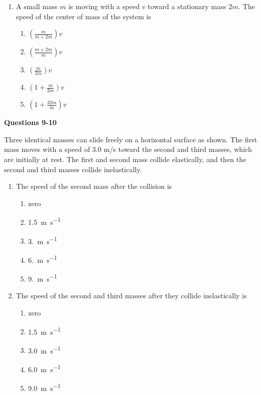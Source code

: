 \documentclass{../../oss-apphys}
\begin{document}
\begin{multicols}{2}
\begin{enumerate}[leftmargin=18pt,resume]
  \item A small mass $m$ is moving with a speed $v$ toward a stationary mass
    $2m$. The speed of the center of mass of the system is
    \begin{enumerate}[noitemsep,topsep=0pt,leftmargin=18pt,label=(\Alph*)]
    \item $\displaystyle\left(\frac{m}{m+2m}\right)v$
    \item $\displaystyle\left(\frac{m+2m}{m}\right)v$
    \item $\displaystyle\left(\frac{m}{2m}\right)v$
    \item $\displaystyle\left(1+\frac{m}{2m}\right)v$
    \item $\displaystyle\left(1+\frac{32m}{m}\right)v$
    \end{enumerate}
  \end{enumerate}
  
  \textbf{Questions 9-10}

  Three identical masses can slide freely on a horizontal surface as shown.
  The first mass moves with a speed of 3.0 m/s toward the second and third
  masses, which are initially at rest. The first and second mass collide
  elastically, and then the second and third masses collide inelastically.
  \begin{center}
  \end{center}

  \begin{enumerate}[leftmargin=18pt,resume]
  \item The speed of the second mass after the collision is
    \begin{enumerate}[noitemsep,topsep=0pt,leftmargin=18pt,label=(\Alph*)]
    \item zero
    \item\SI{1.5}{\metre\per\second}
    \item\SI{3.}{\metre\per\second}
    \item\SI{6.}{\metre\per\second}
    \item\SI{9.}{\metre\per\second}
    \end{enumerate}

  \item The speed of the second and third masses after they collide
    inelastically is
    \begin{enumerate}[noitemsep,topsep=0pt,leftmargin=18pt,label=(\Alph*)]
    \item zero
    \item\SI{1.5}{\metre\per\second}
    \item\SI{3.0}{\metre\per\second}
    \item\SI{6.0}{\metre\per\second}
    \item\SI{9.0}{\metre\per\second}
    \end{enumerate}
    

\end{enumerate}
\end{multicols}
\end{document}
